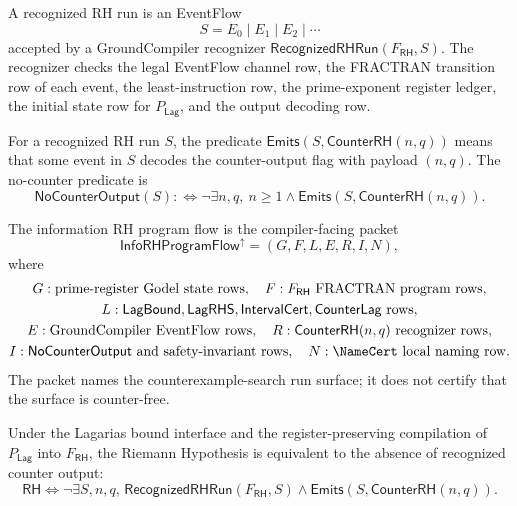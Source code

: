 \begin{definition}
\label{def:rh-recognized-run}
A recognized RH run is an EventFlow
$$
S=E_0\mid E_1\mid E_2\mid\cdots
$$
accepted by a GroundCompiler recognizer
$\mathsf{RecognizedRHRun}(F_{\mathsf{RH}},S)$.  The recognizer checks the
legal EventFlow channel row, the FRACTRAN transition row of each event, the
least-instruction row, the prime-exponent register ledger, the initial
state row for $P_{\mathsf{Lag}}$, and the output decoding row.
\end{definition}

\begin{definition}
\label{def:rh-counter-output}
For a recognized RH run $S$, the predicate
$\mathsf{Emits}(S,\mathsf{CounterRH}(n,q))$ means that some event in $S$
decodes the counter-output flag with payload $(n,q)$.  The no-counter
predicate is
$$
\mathsf{NoCounterOutput}(S)
:\Longleftrightarrow
\neg\exists n,q,\ n\geq 1\wedge
\mathsf{Emits}(S,\mathsf{CounterRH}(n,q)).
$$
\end{definition}

\begin{definition}
\label{def:rh-info-program-flow}
The information RH program flow is the compiler-facing packet
$$
\mathsf{InfoRHProgramFlow}^{\uparrow}
=
(G,F,L,E,R,I,N),
$$
where
$$
\begin{gathered}
G:\text{prime-register Godel state rows},\quad
F:F_{\mathsf{RH}}\text{ FRACTRAN program rows},\\
L:\mathsf{LagBound},\mathsf{LagRHS},\mathsf{IntervalCert},
\mathsf{CounterLag}\text{ rows},\\
E:\text{GroundCompiler EventFlow rows},\quad
R:\mathsf{CounterRH}(n,q)\text{ recognizer rows},\\
I:\mathsf{NoCounterOutput}\text{ and safety-invariant rows},\quad
N:\NameCert\text{ local naming row}.
\end{gathered}
$$
The packet names the counterexample-search run surface; it does not certify
that the surface is counter-free.
\end{definition}

\begin{theorem}
\label{thm:rh-program-safety-normal-form}
Under the Lagarias bound interface and the register-preserving compilation
of $P_{\mathsf{Lag}}$ into $F_{\mathsf{RH}}$, the Riemann Hypothesis is
equivalent to the absence of recognized counter output:
$$
\mathsf{RH}
\Longleftrightarrow
\neg\exists S,n,q,\,
\mathsf{RecognizedRHRun}(F_{\mathsf{RH}},S)
\wedge
\mathsf{Emits}(S,\mathsf{CounterRH}(n,q)).
$$
\end{theorem}

